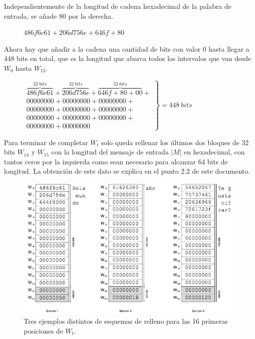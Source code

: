 \documentclass{article}
\begin{document}
        Independientemente de la longitud de cadena hexadecimal de la palabra de entrada, se añade $80$ por la derecha.
            \begin{figure}[H]
            \centering
                $486f6c61 + 206d756e + 646f + 80$
            \end{figure}
        
        Ahora hay que añadir a la cadena una cantidad de bits con valor $0$ hasta llegar a 448 bits en total, que es la longitud que abarca todos los intervalos que van desde $W_{0}$ hasta $W_{13}$.
            \begin{figure}[H]
            \centering
                $\left .
                \begin{array}{l}
                    \overbrace{486f6c61}^{32 \ bits}+\overbrace{206d756e}^{32 \ bits}+\overbrace{646f + 80 + 00}^{32 \ bits}+ \\
                    00000000+00000000+00000000+ \\
                    00000000+00000000+00000000+ \\
                    00000000+00000000+00000000+ \\
                    00000000+00000000
                \end{array}
                \right \} = 448 \ bits$
            \end{figure}

        Para terminar de completar $W_{t}$ solo queda rellenar los últimos dos bloques de 32 bits $W_{14}$ y $W_{15}$ con la longitud del mensaje de entrada $|M|$ en hexadecimal, con tantos ceros por la izquierda como sean necesario para alcanzar 64 bits de longitud. La obtención de este dato se explica en el punto 2.2 de este documento.
            \begin{figure}[H]
            \centering
                \includegraphics[scale=0.49]{img/SHA-256-W0-W15}
                \caption{Tres ejemplos distintos de esquemas de relleno para las 16 primeras posiciones de $W_{t}$.}
            \end{figure}
    
\end{document}
